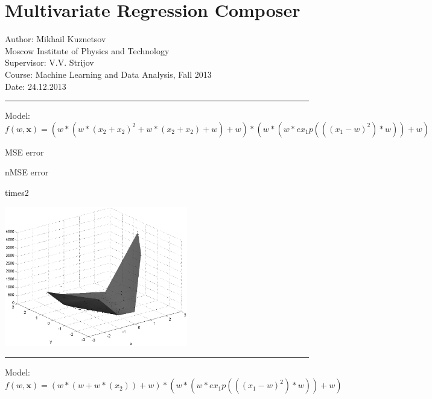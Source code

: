 \documentclass[12pt]{article}
\begin{document}
\section*{Multivariate Regression Composer}
Author: Mikhail Kuznetsov\\
Moscow Institute of Physics and Technology\\
Supervisor: V.V. Strijov\\
Course: Machine Learning and Data Analysis, Fall 2013\\
Date: 24.12.2013\\
\hrule
\vspace{1cm}
Model: $f(w,\mathbf{x})=(w*(w*(x_2+x_2)^2+w*(x_2+x_2)+w)+w)*(w*(w*ex_1p(((x_1-w)^2)*w))+w)$

MSE error

nMSE error

\begin{multicols}{2}
\begin{bundle}{times2}\end{bundle}

\columnbreak
\includegraphics[width=8cm]{1.eps}
\end{multicols}

\hrule
\vspace{1cm}
Model: $f(w,\mathbf{x})=(w*(w+w*(x_2))+w)*(w*(w*ex_1p(((x_1-w)^2)*w))+w)$
\end{document}

